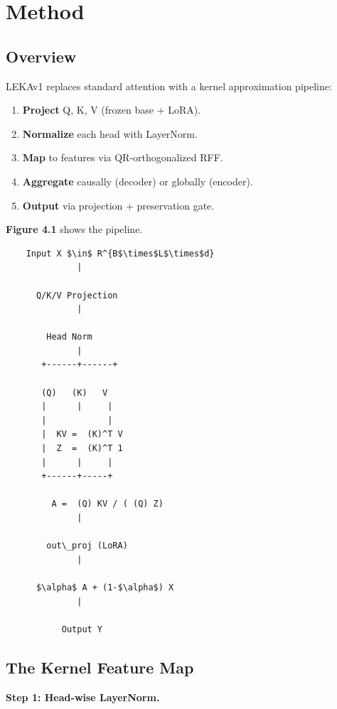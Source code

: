 \section{Method}

\subsection{Overview}

LEKAv1 replaces standard attention with a kernel approximation pipeline:

\begin{enumerate}
\item \textbf{Project} Q, K, V (frozen base + LoRA).
\item \textbf{Normalize} each head with LayerNorm.
\item \textbf{Map} to features via QR-orthogonalized RFF.
\item \textbf{Aggregate} causally (decoder) or globally (encoder).
\item \textbf{Output} via projection + preservation gate.

\end{enumerate}
\textbf{Figure 4.1} shows the pipeline.

\begin{lstlisting}
    Input X $\in$ R^{B$\times$L$\times$d}
              |
               
      Q/K/V Projection
              |
               
        Head Norm
              |
       +------+------+
                      
       (Q)   (K)   V
       |      |     |
       |            |
       |  KV =  (K)^T V
       |  Z  =  (K)^T 1
       |      |     |
       +------+-----+
               
         A =  (Q) KV / ( (Q) Z)
              |
               
        out\_proj (LoRA)
              |
               
      $\alpha$ A + (1-$\alpha$) X
              |
               
           Output Y
\end{lstlisting}

\subsection{The Kernel Feature Map}

\textbf{Step 1: Head-wise LayerNorm.}

